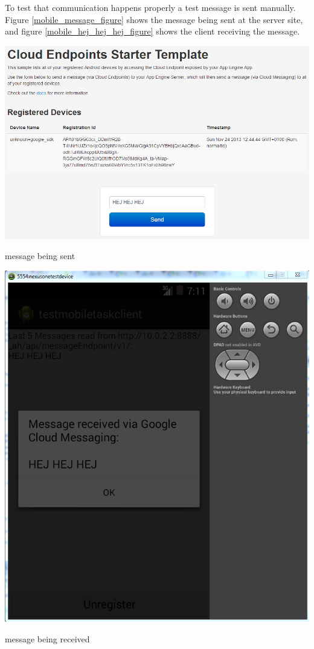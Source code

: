 \pagebreak
To test that communication happens properly a test message is sent manually. Figure \ref{mobile_message_figure} shows the message being sent at the server site, and figure \ref{mobile_hej_hej_hej_figure} shows the client receiving the message.\\
\begin{center}
	\centering
	\includegraphics[scale=0.5]{images/googlemessagin_sendmessage.png}
	\caption{message being sent}
	\label{mobile_message_figure}
\end{center}
\begin{center}
	\centering
	\includegraphics[scale=0.7]{images/googlecloudmessaging.png}
	\caption{message being received}
	\label{mobile_hej_hej_hej_figure}
\end{center}


